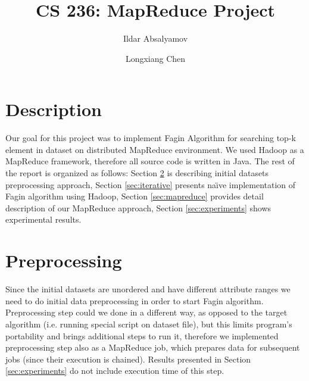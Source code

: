 \documentclass[a4paper]{article}
\title{CS 236: MapReduce Project}
\author{Ildar Absalyamov \and Longxiang Chen}
\begin{document}
\maketitle

\section{Description}

Our goal for this project was to implement Fagin Algorithm for searching top-k element in dataset on distributed MapReduce environment.
We used Hadoop as a MapReduce framework, therefore all source code is written in Java.
The rest of the report is organized as follows: Section \ref{sec:preprocess} is describing initial datasets preprocessing approach, Section \ref{sec:iterative} presents na\"{\i}ve implementation of Fagin algorithm using Hadoop, Section \ref{sec:mapreduce} provides detail description of our MapReduce approach, Section \ref{sec:experiments} shows experimental results.

\section{Preprocessing}
\label{sec:preprocess}

Since the initial datasets are unordered and have different attribute ranges we need to do initial data preprocessing in order to start Fagin algorithm.
Preprocessing step could we done in a different way, as opposed to the target algorithm (i.e. running special script on dataset file), but this limits program's portability and brings additional steps to run it, therefore we implemented preprocessing step also as a MapReduce job, which prepares data for subsequent jobs (since their execution is chained).
Results presented in Section \ref{sec:experiments} do not include execution time of this step.
\end{document}
